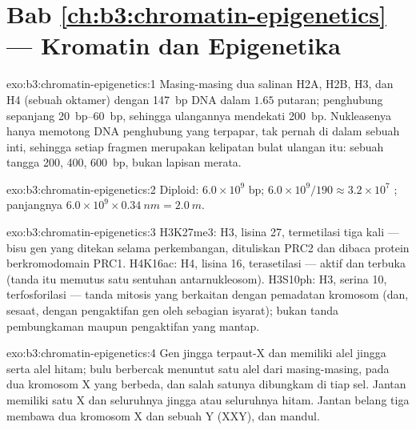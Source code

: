 \section*{Bab \ref{ch:b3:chromatin-epigenetics} --- Kromatin dan Epigenetika}

\begin{solution}{exo:b3:chromatin-epigenetics:1}
Masing-masing dua salinan H2A, H2B, H3, dan H4 (sebuah oktamer) dengan
\qty{147}{bp} DNA dalam $1.65$ putaran; penghubung sepanjang
\qtyrange{20}{60}{bp}, sehingga ulangannya mendekati \qty{200}{bp}.
Nukleasenya hanya memotong DNA penghubung yang terpapar, tak pernah di dalam
sebuah inti, sehingga setiap fragmen merupakan kelipatan bulat ulangan itu:
sebuah tangga \num{200}, \num{400}, \qty{600}{bp}, bukan lapisan merata.
\end{solution}

\begin{solution}{exo:b3:chromatin-epigenetics:2}
Diploid: $6.0\times 10^{9}$ bp; $6.0\times 10^{9}/190 \approx
3.2\times 10^{7}$ ; panjangnya $6.0\times 10^{9}\times
\qty{0.34}{nm} = \qty{2.0}{m}$.
\end{solution}

\begin{solution}{exo:b3:chromatin-epigenetics:3}
H3K27me3:  H3, lisina 27, termetilasi tiga kali ---  bisu gen
yang ditekan selama perkembangan, dituliskan PRC2 dan dibaca protein
berkromodomain PRC1. H4K16ac: H4, lisina 16, terasetilasi ---  aktif
dan terbuka (tanda itu memutus satu sentuhan antarnukleosom). H3S10ph: H3,
serina 10, terfosforilasi --- tanda mitosis yang berkaitan dengan pemadatan
kromosom (dan, sesaat, dengan pengaktifan gen oleh sebagian isyarat); bukan
tanda pembungkaman maupun pengaktifan yang mantap.
\end{solution}

\begin{solution}{exo:b3:chromatin-epigenetics:4}
Gen jingga terpaut-X dan memiliki alel jingga serta alel hitam; bulu
berbercak menuntut satu alel dari masing-masing, pada dua kromosom X yang
berbeda, dan salah satunya dibungkam di tiap sel. Jantan memiliki satu X dan
seluruhnya jingga atau seluruhnya hitam. Jantan belang tiga membawa dua
kromosom X dan sebuah Y (XXY), dan mandul.
\end{solution}

